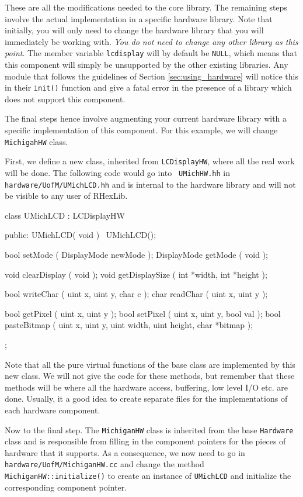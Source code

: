 These are all the modifications needed to the core library. The remaining
steps involve the actual implementation in a specific hardware library. Note
that initially, you will only need to change the hardware library that you
will immediately be working with. {\em You do not need to change any other
library as this point}. The member variable {\tt lcdisplay} will by default
be {\tt NULL}, which means that this component will simply be unsupported by
the other existing libraries. Any module that follows the guidelines of
Section \ref{sec:using_hardware} will notice this in their {\tt init()}
function and give a fatal error in the presence of a library which does not
support this component.

The final steps hence involve augmenting your current hardware library with
a specific implementation of this component. For this example, we will
change {\tt MichigahHW} class.

First, we define a new class, inherited from {\tt LCDisplayHW}, where all
the real work will be done. The following code would go into {\tt
  UMichHW.hh} in {\tt hardware/UofM/UMichLCD.hh} and is internal to the
hardware library and will not be visible to any user of RHexLib.

\begin{classdef}
class UMichLCD : LCDisplayHW {
  public:
    UMichLCD( void )
    ~UMichLCD();

    bool        setMode ( DisplayMode newMode );
    DisplayMode getMode ( void );

    void clearDisplay ( void );
    void getDisplaySize ( int *width, int *height );

    bool writeChar ( uint x, uint y, char c );
    char readChar ( uint x, uint y );

    bool getPixel ( uint x, uint y );
    bool setPixel ( uint x, uint y, bool val );
    bool pasteBitmap ( uint x, uint y, 
                       uint width, uint height, char *bitmap );
};
\end{classdef}

Note that all the pure virtual functions of the base class are implemented
by this new class. We will not give the code for these methods, but remember
that these methods will be where all the hardware access, buffering, low
level I/O etc. are done. Usually, it a good idea to create separate files
for the implementations of each hardware component.

Now to the final step. The {\tt MichiganHW} class is inherited from the base
{\tt Hardware} class and is responsible from filling in the component
pointers for the pieces of hardware that it supports. As a consequence, we
now need to go in {\tt hardware/UofM/MichiganHW.cc} and change the method
{\tt MichiganHW::initialize()} to create an instance of {\tt UMichLCD} and
initialize the corresponding component pointer.

